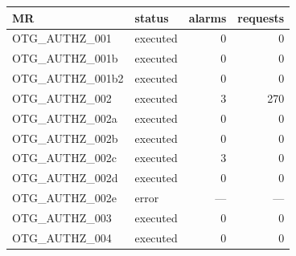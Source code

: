 \begin{tabular}{llrr}
\toprule
MR & status & alarms & requests \\
\midrule
OTG\_AUTHZ\_001 & executed & 0 & 0 \\
OTG\_AUTHZ\_001b & executed & 0 & 0 \\
OTG\_AUTHZ\_001b2 & executed & 0 & 0 \\
OTG\_AUTHZ\_002 & executed & 3 & 270 \\
OTG\_AUTHZ\_002a & executed & 0 & 0 \\
OTG\_AUTHZ\_002b & executed & 0 & 0 \\
OTG\_AUTHZ\_002c & executed & 3 & 0 \\
OTG\_AUTHZ\_002d & executed & 0 & 0 \\
OTG\_AUTHZ\_002e & error & --- & --- \\
OTG\_AUTHZ\_003 & executed & 0 & 0 \\
OTG\_AUTHZ\_004 & executed & 0 & 0 \\
\bottomrule
\end{tabular}
